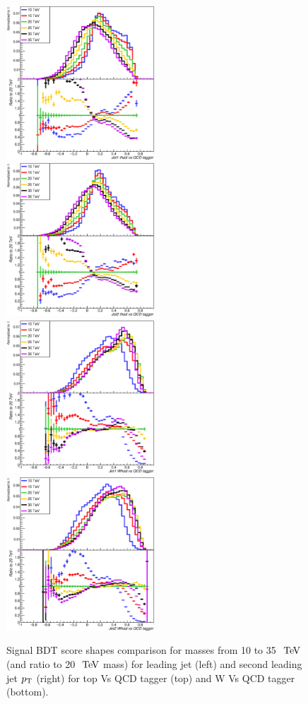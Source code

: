 \begin{figure}[!htb]\centering
\includegraphics[width=0.495\textwidth]{Fig/TMVA/Jet1_thad_vs_QCD_tagger.eps}
\includegraphics[width=0.495\textwidth]{Fig/TMVA/Jet2_thad_vs_QCD_tagger.eps}
\includegraphics[width=0.495\textwidth]{Fig/TMVA/Jet1_Whad_vs_QCD_tagger.eps}
\includegraphics[width=0.495\textwidth]{Fig/TMVA/Jet2_Whad_vs_QCD_tagger.eps}
\caption{Signal BDT score shapes comparison for masses from 10 to 35 $\TeV$ (and ratio to 20 $\TeV$ mass) for leading jet (left) and second leading jet $p_{\text{T}}$ (right) for top Vs QCD tagger (top) and W Vs QCD tagger (bottom).}
\label{fig:BDT_signal_shape_comparison}
\end{figure}

